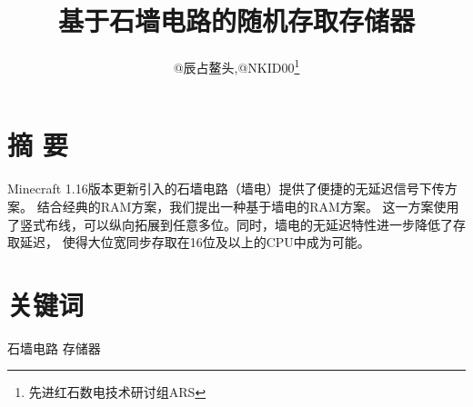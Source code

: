 \documentclass[UTF8,12pt,punct=kaiming,fontset=none]{ctexart}
\title{\vspace{-1.5cm}基于石墙电路的随机存取存储器\vspace{-0.5cm}}
\author{@辰占鳌头,@NKID00\thanks{先进红石数电技术研讨组ARS}}
\date{}
\begin{document}
\hypersetup{bookmarksdepth=-1}  %
\maketitle
\thispagestyle{fancy}  %
\vspace{-0.7cm}

\begin{flushright}
    \begin{minipage}[c]{0.91\linewidth}
        \titleformat{\section}[leftmargin]{\sffamily\small\bfseries}{}{0cm}{}
        \titlespacing{\section}{1.5cm}{1ex}{0cm}

        \section{摘 \hspace{0.105cm} 要}
        \small Minecraft 1.16版本更新引入的石墙电路（墙电）提供了便捷的无延迟信号下传方案。
        结合经典的RAM方案，我们提出一种基于墙电的RAM方案。
        这一方案使用了竖式布线，可以纵向拓展到任意多位。同时，墙电的无延迟特性进一步降低了存取延迟，
        使得大位宽同步存取在16位及以上的CPU中成为可能。

        \section{关键词}
        \small 石墙电路 \hspace{0.5cm} 存储器
    \end{minipage}
\end{flushright}
\vspace{0.2cm}

\titleformat{\section}[hang]{\large\sffamily\bfseries}{\textmd{\thesection}}{0.5cm}{}
\titlespacing{\section}{0cm}{0.5ex}{0.2ex}
\titleformat{\subsection}[hang]{\normalsize\sffamily}{\textmd{\thesubsection}}{0.5cm}{}
\titlespacing{\subsection}{0cm}{0.5ex}{0.2ex}
\setcounter{section}{0}
\end{document}

